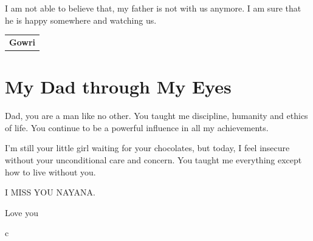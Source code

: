 I am not able to believe that, my father is not with us anymore. I am sure that he is happy somewhere and watching us.

\bigskip
\begin{flushright}
\begin{tabular}{c}
\multicolumn{1}{p{2cm}}{\textbf{Gowri}}
\end{tabular}
\end{flushright}


\section*{My Dad through My Eyes}

Dad, you are a man like no other. You taught me discipline, humanity and ethics of life. You continue to be a powerful influence in all my achievements.

I’m still your little girl waiting for your chocolates, but today, I feel insecure without your unconditional care and concern. You taught me everything except how to live without you.
\bigskip

\noindent I MISS YOU NAYANA.

\noindent Love you

\begin{flushright}
\begin{tabular}{c}
\end{tabular}
\end{flushright}

\newpage
